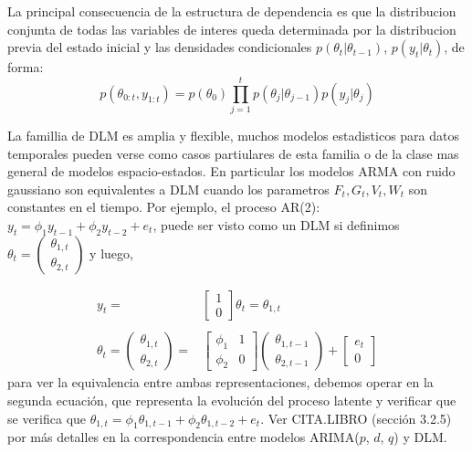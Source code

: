 \documentclass[12pt]{article}\usepackage[]{graphicx}\usepackage[]{color}
\begin{document}
La principal consecuencia de la estructura de dependencia es que la distribucion conjunta de todas las variables de interes queda determinada por la distribucion previa del estado inicial y las densidades condicionales $p(\theta_t | \theta_{t-1})$, $p(y_t|\theta_t)$, de forma: 
\[
p(\theta_{0:t}, y_{1:t}) =  p(\theta_0) \prod_{j=1}^t  p(\theta_j | \theta_{j-1})  p(y_j|\theta_j)
\]

La famillia de DLM es amplia y flexible, muchos modelos estadisticos para datos temporales pueden verse como casos partiulares de esta familia o de la clase mas general de modelos espacio-estados. En particular los modelos ARMA con ruido gaussiano son equivalentes a DLM cuando los parametros $F_t, G_t, V_t, W_t$ son constantes en el tiempo. Por ejemplo, el proceso  AR(2): $y_t = \phi_1 y_{t-1} + \phi_2 y_{t-2} + e_t$, puede ser visto como un DLM si definimos $\theta_t = 
\begin{pmatrix}
\theta_{1,t} \\
\theta_{2,t}
\end{pmatrix}
$
y luego, 

\[ \begin{array}{rl}
y_t = & \begin{bmatrix}
1 \\
0
\end{bmatrix}
\theta_t = \theta_{1,t} \\
& \\
\theta_t = \begin{pmatrix} \theta_{1,t} \\ \theta_{2,t} \end{pmatrix} = &
\begin{bmatrix} \phi_1 & 1 \\ \phi_2 & 0 \end{bmatrix}
\begin{pmatrix} \theta_{1,t-1} \\ \theta_{2,t-1} \end{pmatrix}
+
\begin{bmatrix} e_t \\ 0 \end{bmatrix}
\end{array}
\]
para ver la equivalencia entre ambas representaciones, debemos operar en la segunda ecuación, que representa la evolución del proceso latente y verificar que se verifica que $\theta_{1,t} = \phi_1 \theta_{1,t-1} + \phi_2 \theta_{1,t-2} + e_t$. Ver CITA.LIBRO (sección 3.2.5) por más detalles en la correspondencia entre modelos ARIMA($p$, $d$, $q$) y DLM. 
\end{document}
